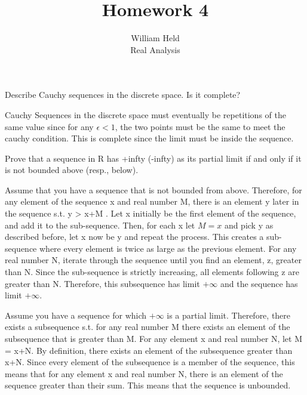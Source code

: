 \documentclass[12pt]{article}
\newenvironment{exercise}[2][Exercise]{\begin{trivlist}
\item[\hskip \labelsep {\bfseries #1}\hskip \labelsep {\bfseries #2.}]}{\end{trivlist}}
\begin{document}
 
 
 
\title{Homework 4}%
\author{William Held\\ %
Real Analysis} %

\newcommand{\norm}[1]{\left\lVert#1\right\rVert}
\newcommand{\abs}[1]{|#1|}
\newcommand{\ceil}[1]{\left \lceil #1 \right \rceil }
\newcommand{\floor}[1]{\left \lfloor #1 \right \rfloor }
\let\biconditional\leftrightarrow
\maketitle
\begin{exercise}{1.1}
Describe Cauchy sequences in the discrete space. Is it complete?
\end{exercise}
Cauchy Sequences in the discrete space must eventually be repetitions of the same value since for any $\epsilon < 1$, the two points must be the same to meet the cauchy condition. This is complete since the limit must be inside the sequence.

\begin{exercise}{1.2}
Prove that a sequence in R has +infty (-infty) as its partial limit if and only if it is not bounded above (resp., below).
\end{exercise}
Assume that you have a sequence that is not bounded from above. Therefore, for any element of the sequence x and real number M, there is an element y later in the sequence s.t. y > x+M . Let x initially be the first element of the sequence, and add it to the sub-sequence. Then, for each x let $M=x$ and pick y as described before, let x now be y and repeat the process. This creates a sub-sequence where every element is twice as large as the previous element. For any real number N, iterate through the sequence until you find an element, z, greater than N. Since the sub-sequence is strictly increasing, all elements following z are greater than N. Therefore, this subsequence has limit $+\infty$ and the sequence has limit $+\infty$.

Assume you have a sequence for which $+\infty$ is a partial limit. Therefore, there exists a subsequence s.t. for any real number M there exists an element of the subsequence that is greater than M. For any element x and real number N, let M = x+N. By definition, there exists an element of the subsequence greater than x+N. Since every element of the subsequence is a member of the sequence, this means that for any element x and real number N, there is an element of the sequence greater than their sum. This means that the sequence is unbounded.
\end{document}
